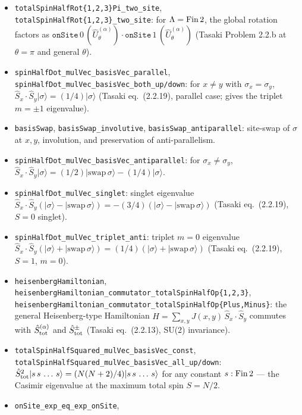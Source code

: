 \documentclass[a4paper,11pt]{article}
\begin{document}
\begin{itemize}
\item \texttt{totalSpinHalfRot\{1,2,3\}Pi\_two\_site},
  \texttt{totalSpinHalfRot\{1,2,3\}\_two\_site}: for $\Lambda = {\rm Fin}\,2$,
  the global rotation factors as $\texttt{onSite}\,0\,(\hat U^{(\alpha)}_\theta)
  \cdot \texttt{onSite}\,1\,(\hat U^{(\alpha)}_\theta)$ (Tasaki Problem
  2.2.b at $\theta = \pi$ and general $\theta$).
\item \texttt{spinHalfDot\_mulVec\_basisVec\_parallel},
  \texttt{spinHalfDot\_mulVec\_basisVec\_both\_up/down}: for $x \neq y$
  with $\sigma_x = \sigma_y$, $\hat S_x \cdot \hat S_y |\sigma\rangle =
  (1/4)|\sigma\rangle$ (Tasaki eq.~(2.2.19), parallel case; gives the
  triplet $m = \pm 1$ eigenvalue).
\item \texttt{basisSwap}, \texttt{basisSwap\_involutive},
  \texttt{basisSwap\_antiparallel}: site-swap of $\sigma$ at $x, y$,
  involution, and preservation of anti-parallelism.
\item \texttt{spinHalfDot\_mulVec\_basisVec\_antiparallel}: for
  $\sigma_x \neq \sigma_y$, $\hat S_x \cdot \hat S_y |\sigma\rangle =
  (1/2)|\mathrm{swap}\,\sigma\rangle - (1/4)|\sigma\rangle$.
\item \texttt{spinHalfDot\_mulVec\_singlet}: singlet eigenvalue
  $\hat S_x \cdot \hat S_y (|\sigma\rangle - |\mathrm{swap}\,\sigma\rangle)
  = -(3/4)(|\sigma\rangle - |\mathrm{swap}\,\sigma\rangle)$ (Tasaki
  eq.~(2.2.19), $S = 0$ singlet).
\item \texttt{spinHalfDot\_mulVec\_triplet\_anti}: triplet $m = 0$
  eigenvalue $\hat S_x \cdot \hat S_y (|\sigma\rangle + |\mathrm{swap}\,\sigma\rangle)
  = (1/4)(|\sigma\rangle + |\mathrm{swap}\,\sigma\rangle)$ (Tasaki
  eq.~(2.2.19), $S = 1$, $m = 0$).
\item \texttt{heisenbergHamiltonian},
  \texttt{heisenbergHamiltonian\_commutator\_totalSpinHalfOp\{1,2,3\}},
  \texttt{heisenbergHamiltonian\_commutator\_totalSpinHalfOp\{Plus,Minus\}}:
  the general Heisenberg-type Hamiltonian
  $H = \sum_{x,y} J(x,y)\,\hat S_x \cdot \hat S_y$ commutes with
  $\hat S^{(\alpha)}_{\rm tot}$ and $\hat S^{\pm}_{\rm tot}$
  (Tasaki eq.~(2.2.13), SU(2) invariance).
\item \texttt{totalSpinHalfSquared\_mulVec\_basisVec\_const},
  \texttt{totalSpinHalfSquared\_mulVec\_basisVec\_all\_up/down}:
  $\hat S_{\rm tot}^2 |s\,s\,\dots\,s\rangle = (N(N+2)/4)|s\,s\,\dots\,s\rangle$
  for any constant $s : {\rm Fin}\,2$ — the Casimir eigenvalue at
  the maximum total spin $S = N/2$.
\item \texttt{onSite\_exp\_eq\_exp\_onSite},

\end{itemize}
\end{document}
